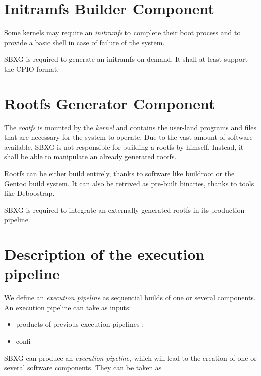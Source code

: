 \documentclass{article}
\begin{document}
\section{Initramfs Builder Component}

Some kernels may require an \emph{initramfs} to complete their boot process and
to provide a basic shell in case of failure of the system.

\begin{requirement}
SBXG is required to generate an initramfs on demand. It shall at least support
the CPIO format.
\end{requirement}


\section{Rootfs Generator Component}

The \emph{rootfs} is mounted by the \emph{kernel} and contains the user-land
programs and files that are necessary for the system to operate. Due to the vast
amount of software available, SBXG is not responsible for building a rootfs by
himself. Instead, it shall be able to manipulate an already generated rootfs.

Rootfs can be either build entirely, thanks to software like buildroot or the
Gentoo build system. It can also be retrived as pre-built binaries, thanks to
tools like Deboostrap.

\begin{requirement}
SBXG is required to integrate an externally generated rootfs in its production
pipeline.
\end{requirement}

\section{Description of the execution pipeline}

We define an \emph{execution pipeline} as sequential builds of one or several components.
An execution pipeline can take as inputs:
\begin{itemize}
\item products of previous execution pipelines ;
  \item confi
\end{itemize}

SBXG can produce an \emph{execution pipeline}, which will lead to the creation
of one or several software components. They can be taken as
\end{document}
